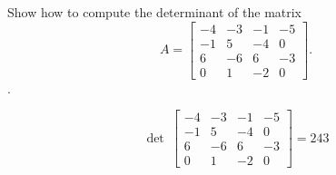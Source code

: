 
\begin{exerciseStatement}


Show how to compute the determinant of the matrix \[A= \left[\begin{array}{cccc}
-4 & -3 & -1 & -5 \\
-1 & 5 & -4 & 0 \\
6 & -6 & 6 & -3 \\
0 & 1 & -2 & 0
\end{array}\right] .\].


\end{exerciseStatement}
    
\begin{exerciseAnswer} 
\[\operatorname{det}\  \left[\begin{array}{cccc}
-4 & -3 & -1 & -5 \\
-1 & 5 & -4 & 0 \\
6 & -6 & 6 & -3 \\
0 & 1 & -2 & 0
\end{array}\right] = 243 \]
\end{exerciseAnswer}
    
